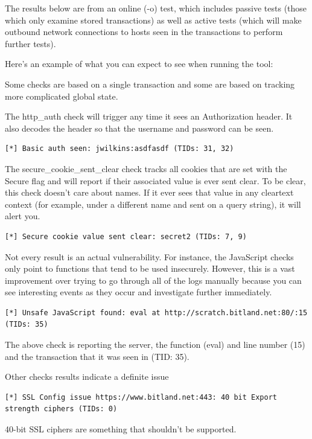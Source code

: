 \documentclass{article}
\begin{document}
The results below are from an online (-o) test, which includes passive tests (those
which only examine stored transactions) as well as active tests (which will make outbound
network connections to hosts seen in the transactions to perform further tests).  

Here's an example of what you can expect to see when running the tool:


Some checks are based on a single transaction and some are based on tracking more
complicated global state.

The http\_auth check will trigger any time it sees an Authorization header.  It
also decodes the header so that the username and password can be seen.
\begin{lstlisting}[style=output]
[*] Basic auth seen: jwilkins:asdfasdf (TIDs: 31, 32)
\end{lstlisting}

The secure\_cookie\_sent\_clear check tracks all cookies that are set with the
Secure flag and will report if their associated value is ever sent clear.  To 
be clear, this check doesn't care about names.  If it ever sees that value in any
cleartext context (for example, under a different name and sent on a query string), 
it will alert you.
\begin{lstlisting}[style=output]
[*] Secure cookie value sent clear: secret2 (TIDs: 7, 9)
\end{lstlisting}

Not every result is an actual vulnerability.  For instance, the JavaScript checks
only point to functions that tend to be used insecurely.  However, this is a 
vast improvement over trying to go through all of the logs manually because you
can see interesting events as they occur and investigate further immediately.

\begin{lstlisting}[style=output]
[*] Unsafe JavaScript found: eval at http://scratch.bitland.net:80/:15 (TIDs: 35)
\end{lstlisting}
The above check is reporting the server, the function (eval) and line number (15) and the
transaction that it was seen in (TID: 35).

Other checks results indicate a definite issue
\begin{lstlisting}[style=output]
[*] SSL Config issue https://www.bitland.net:443: 40 bit Export strength ciphers (TIDs: 0)
\end{lstlisting}
40-bit SSL ciphers are something that shouldn't be supported.
\end{document}
